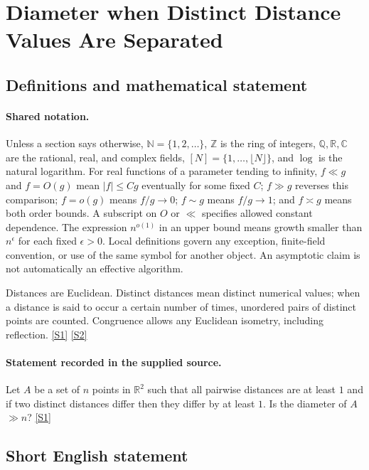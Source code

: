 \documentclass[11pt,a4paper]{article}
\newcommand{\N}{\mathbb{N}}
\newcommand{\Z}{\mathbb{Z}}
\newcommand{\Q}{\mathbb{Q}}
\newcommand{\R}{\mathbb{R}}
\newcommand{\C}{\mathbb{C}}
\newcommand{\sref}[2]{\hyperlink{source:#1:#2}{[S#2]}}
\begin{document}
\section{Diameter when Distinct Distance Values Are Separated}\label{statement}


\subsection{Definitions and mathematical statement}

\paragraph{Shared notation.}Unless a section says otherwise, $\N=\{1,2,\ldots\}$,
$\Z$ is the ring of integers, $\Q,\R,\C$ are the rational, real, and complex
fields, $[N]=\{1,\ldots,\lfloor N\rfloor\}$, and $\log$ is the natural
logarithm. For real functions of a parameter tending to infinity,
$f\ll g$ and $f=O(g)$ mean $|f|\leq Cg$ eventually for some fixed $C$;
$f\gg g$ reverses this comparison; $f=o(g)$ means $f/g\to0$;
$f\sim g$ means $f/g\to1$; and $f\asymp g$ means both order bounds.
A subscript on $O$ or $\ll$ specifies allowed constant dependence.
The expression $n^{o(1)}$ in an upper bound means growth smaller than
$n^\epsilon$ for each fixed $\epsilon>0$. Local definitions govern any
exception, finite-field convention, or use of the same symbol for another
object. An asymptotic claim is not automatically an effective algorithm.



Distances are Euclidean. Distinct distances mean distinct numerical values; when a distance is said to occur a certain number of times, unordered pairs of distinct points are counted. Congruence allows any Euclidean isometry, including reflection. \sref{statement}{1} \sref{statement}{2}

\paragraph{Statement recorded in the supplied source.}
Let $A$ be a set of $n$ points in $\mathbb{R}^2$ such that all pairwise distances are at least $1$ and if two distinct distances differ then they differ by at least $1$. Is the diameter of $A$ $\gg n$? \sref{statement}{1}

\subsection{Short English statement}
\end{document}
